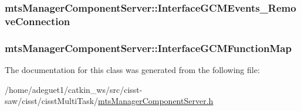 \hypertarget{classmts_manager_component_server_a11a899e797a81a3e84bd4bc7c2025344}{
\subsubsection[{Interface\-G\-C\-M\-Events\-\_\-\-Remove\-Connection}]{ mts\-Manager\-Component\-Server\-::\-Interface\-G\-C\-M\-Events\-\_\-\-Remove\-Connection\hspace{0.3cm}{\ttfamily [protected]}}}\label{classmts_manager_component_server_a11a899e797a81a3e84bd4bc7c2025344}
\hypertarget{classmts_manager_component_server_aba31458f9efbd9bd8f3ffc9335f56c9e}{
\subsubsection[{Interface\-G\-C\-M\-Function\-Map}]{ mts\-Manager\-Component\-Server\-::\-Interface\-G\-C\-M\-Function\-Map\hspace{0.3cm}{\ttfamily [protected]}}}\label{classmts_manager_component_server_aba31458f9efbd9bd8f3ffc9335f56c9e}


The documentation for this class was generated from the following file\-:\begin{DoxyCompactItemize}
\item 
/home/adeguet1/catkin\-\_\-ws/src/cisst-\/saw/cisst/cisst\-Multi\-Task/\hyperlink{mts_manager_component_server_8h}{mts\-Manager\-Component\-Server.\-h}\end{DoxyCompactItemize}
